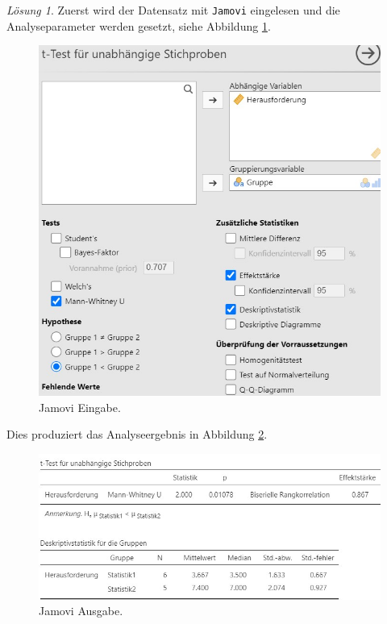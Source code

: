 \documentclass[
]{book}
\theoremstyle{definition}
\theoremstyle{definition}
\theoremstyle{definition}
\theoremstyle{definition}
\theoremstyle{remark}
\newtheorem*{solution}{Lösung}
\begin{document}
\begin{solution}

Zuerst wird der Datensatz mit \texttt{Jamovi} eingelesen und die Analyseparameter werden gesetzt, siehe Abbildung \ref{fig:sol-statistik-herausforderung-input}.

\begin{figure}
\includegraphics[width=1\linewidth]{figures/07-exr-statistik-herausforderung-jmv-input} \caption{Jamovi Eingabe.}\label{fig:sol-statistik-herausforderung-input}
\end{figure}

Dies produziert das Analyseergebnis in Abbildung \ref{fig:sol-statistik-herausforderung-output}.

\begin{figure}
\includegraphics[width=1\linewidth]{figures/07-exr-statistik-herausforderung-jmv-output} \caption{Jamovi Ausgabe.}\label{fig:sol-statistik-herausforderung-output}
\end{figure}


\end{solution}
\end{document}

